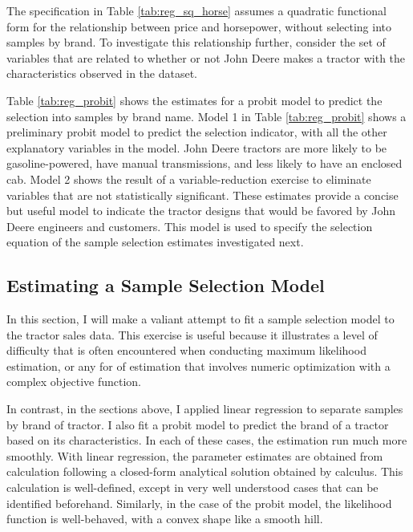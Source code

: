 \documentclass[11pt]{paper}
\begin{document}
The specification in 
Table \ref{tab:reg_sq_horse}
assumes a quadratic functional form for
the relationship between price and horsepower, 
without selecting into samples by brand.
% 
To investigate this relationship further, 
consider the set of variables that are related to
whether or not John Deere makes a tractor
with the characteristics observed in the dataset. 



Table \ref{tab:reg_probit} 
shows the estimates for a probit model to predict the selection
into samples by brand name.
% 
Model 1 in Table \ref{tab:reg_probit} 
shows a preliminary probit model to predict the selection indicator,
with all the other explanatory variables in the model.
John Deere tractors are more likely to be gasoline-powered,
have manual transmissions, and less likely to have an enclosed cab.
% 
Model 2 shows the result of a variable-reduction exercise
to eliminate variables that are not statistically significant.
These estimates provide a concise but useful model to
indicate the tractor designs that would be favored by John Deere
engineers and customers.
This model is used to specify the selection equation
of the sample selection estimates investigated next. 
 
\subsection{Estimating a Sample Selection Model}

In this section, I will make a valiant attempt to fit 
a sample selection model to the tractor sales data. 
This exercise is useful because it illustrates a level of difficulty
that is often encountered when conducting maximum likelihood estimation, 
or any for of estimation that involves numeric optimization
with a complex objective function. 
% 

In contrast, in the sections above, I applied linear regression
to separate samples by brand of tractor. 
I also fit a probit model to predict the brand of a tractor 
based on its characteristics. 
In each of these cases, the estimation run much more smoothly. 
With linear regression, the parameter estimates are obtained 
from calculation following a closed-form analytical solution obtained by calculus. 
This calculation is well-defined, except in very well understood cases
that can be identified beforehand. 
Similarly, in the case of the probit model, the likelihood function is well-behaved, with a convex shape like a smooth hill. 
\end{document}
